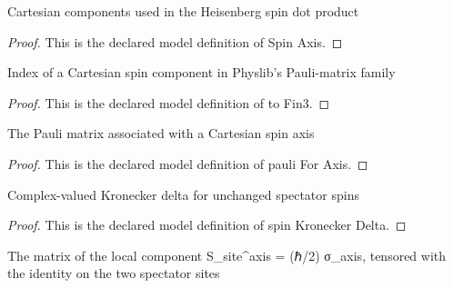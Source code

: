 \begin{definition}
  \label{def:physics:phyx-mini-0606:phyxminiproblems-problemphyxmini0606-spinaxis}
  Cartesian components used in the Heisenberg spin dot product
\end{definition}
\begin{proof}
  This is the declared model definition of Spin Axis.
\end{proof}
\begin{definition}[to Fin3]
  \label{def:physics:phyx-mini-0606:phyxminiproblems-problemphyxmini0606-spinaxis-tofin3}
  Index of a Cartesian spin component in Physlib's Pauli-matrix family
\end{definition}
\begin{proof}
  This is the declared model definition of to Fin3.
\end{proof}
\begin{definition}
  \label{def:physics:phyx-mini-0606:phyxminiproblems-problemphyxmini0606-pauliforaxis}
  The Pauli matrix associated with a Cartesian spin axis
\end{definition}
\begin{proof}
  This is the declared model definition of pauli For Axis.
\end{proof}
\begin{definition}
  \label{def:physics:phyx-mini-0606:phyxminiproblems-problemphyxmini0606-spinkroneckerdelta}
  Complex-valued Kronecker delta for unchanged spectator spins
\end{definition}
\begin{proof}
  This is the declared model definition of spin Kronecker Delta.
\end{proof}
\begin{definition}
  \label{def:physics:phyx-mini-0606:phyxminiproblems-problemphyxmini0606-localspincomponentmatrix}
  The matrix of the local component S\_site\textasciicircum{}axis = (ℏ/2) σ\_axis, tensored with the identity on the two spectator sites
\end{definition}
